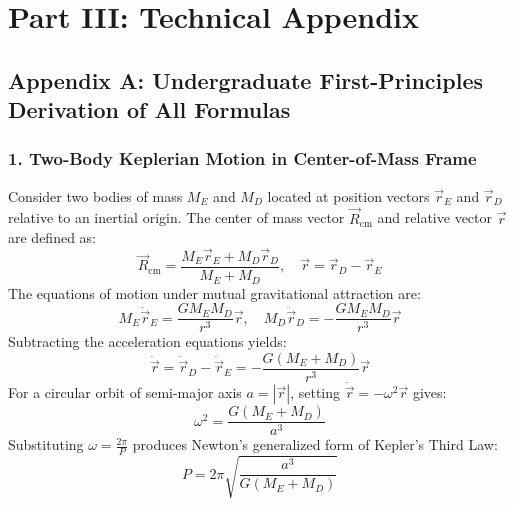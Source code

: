 \documentclass[11pt,a4paper]{article}
\begin{document}
\section*{Part III: Technical Appendix}

\subsection*{Appendix A: Undergraduate First-Principles Derivation of All Formulas}

\subsubsection*{1. Two-Body Keplerian Motion in Center-of-Mass Frame}
Consider two bodies of mass $M_E$ and $M_D$ located at position vectors $\vec{r}_E$ and $\vec{r}_D$ relative to an inertial origin. The center of mass vector $\vec{R}_{\text{cm}}$ and relative vector $\vec{r}$ are defined as:
\begin{equation}
\vec{R}_{\text{cm}} = \frac{M_E \vec{r}_E + M_D \vec{r}_D}{M_E + M_D}, \quad \vec{r} = \vec{r}_D - \vec{r}_E
\end{equation}
The equations of motion under mutual gravitational attraction are:
\begin{equation}
M_E \ddot{\vec{r}}_E = \frac{G M_E M_D}{r^3} \vec{r}, \quad M_D \ddot{\vec{r}}_D = -\frac{G M_E M_D}{r^3} \vec{r}
\end{equation}
Subtracting the acceleration equations yields:
\begin{equation}
\ddot{\vec{r}} = \ddot{\vec{r}}_D - \ddot{\vec{r}}_E = -\frac{G(M_E + M_D)}{r^3} \vec{r}
\end{equation}
For a circular orbit of semi-major axis $a = |\vec{r}|$, setting $\ddot{\vec{r}} = -\omega^2 \vec{r}$ gives:
\begin{equation}
\omega^2 = \frac{G(M_E + M_D)}{a^3}
\end{equation}
Substituting $\omega = \frac{2\pi}{P}$ produces Newton's generalized form of Kepler's Third Law:
\begin{equation}
P = 2\pi \sqrt{\frac{a^3}{G(M_E + M_D)}}
\end{equation}
\end{document}
